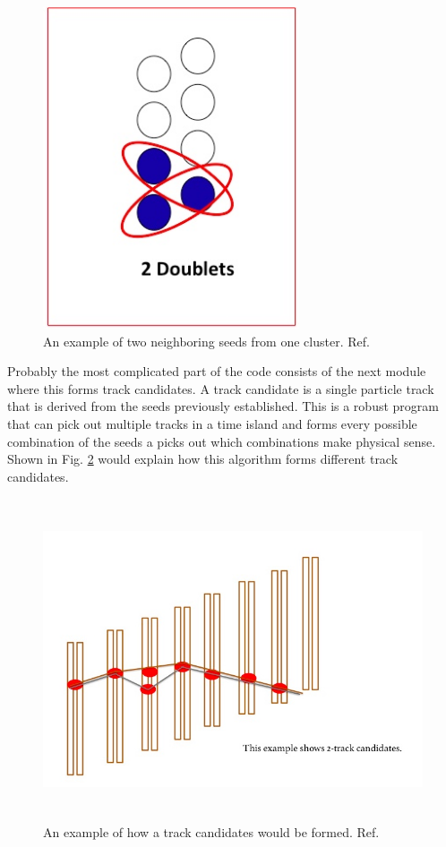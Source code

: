 \documentclass[./Thesis]{subfiles}
\begin{document}
\begin{figure}
	\centerline{\includegraphics[height=95mm]{doubleseed.jpeg}}
	\caption[Double Seed]{ An example of  two neighboring seeds from one cluster.  Ref.\cite{trackerWiki}
	}
	\label{fig:doubleseed}
\end{figure} 
	
	Probably the most complicated part of the code consists of the next module where this forms track candidates. A track candidate is a single particle track that is derived from the seeds previously established.  This is a robust program that can pick out multiple tracks in a time island and forms every possible combination of the seeds a picks out which combinations make physical sense.  Shown in Fig. \ref{fig:trackcandidate} would explain how this algorithm forms different track candidates.
	
\begin{figure}
	\centerline{\includegraphics[height=95mm]{trackcandidate.jpeg}}
	\caption[Track Candidate]{ An example of how a track candidates would be formed.  Ref.\cite{trackerWiki}
	}
	\label{fig:trackcandidate}
\end{figure} 
	
\end{document}
